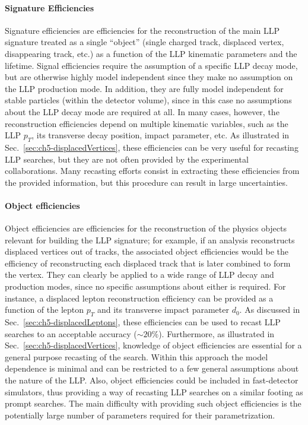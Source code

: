 \paragraph{Signature Efficiencies} Signature efficiencies are efficiencies for the reconstruction of the
main LLP signature treated as a single ``object'' (single charged track, displaced vertex, disappearing
track, etc.) as a function of the LLP kinematic parameters and
the lifetime.
Signal efficiencies require the assumption of a specific LLP decay mode, but
are otherwise highly model independent since they make no assumption on the LLP
production mode.
In addition, they are fully model independent for stable particles
(within the detector volume), since in this case no assumptions about
the LLP decay mode are required at all.
In many cases, however, the reconstruction efficiencies depend on multiple
kinematic variables, such as the LLP $p_T$, its transverse decay position, impact
parameter, etc.
As illustrated in Sec.~\ref{sec:ch5-displacedVertices}, these efficiencies
can be very useful for recasting LLP searches, but  they
are not often provided by the experimental collaborations. Many recasting efforts consist in
extracting these efficiencies from the provided information, but
this procedure can result in large uncertainties.

\paragraph{Object efficiencies} Object efficiencies are efficiencies for the reconstruction of
the physics objects relevant for building the LLP signature; for example, if an analysis
reconstructs displaced vertices out of tracks, the associated object efficiencies would be
the efficiency of reconstructing each displaced track that is later combined to form the vertex.
They can clearly be applied to a wide range of LLP
decay and production modes, since no specific assumptions about either is
required.
For instance, a displaced lepton reconstruction efficiency can be provided
as a function of the lepton $p_T$ and its transverse impact parameter $d_{0}$.
As discussed in Sec.~\ref{sec:ch5-displacedLeptons}, these efficiencies
can be used to recast LLP searches to an acceptable accuracy ($\sim 20\%$).
Furthermore, as illustrated in Sec.~\ref{sec:ch5-displacedVertices},
knowledge of object efficiencies are essential for a general purpose
recasting of the search.
Within this approach the model dependence is minimal and can be
restricted to a few general assumptions about the nature of the LLP.
Also, object efficiencies could be included in fast-detector simulators, thus providing a way of recasting LLP searches
on a similar footing as prompt searches.
The main difficulty with providing such object efficiencies is
the potentially large number of parameters required for their parametrization.

